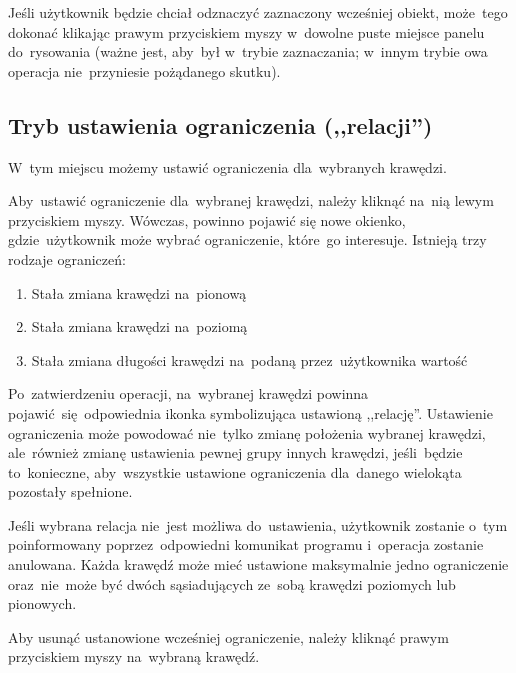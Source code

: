 \documentclass[11pt, a4paper]{article}
\begin{document}
 Jeśli użytkownik będzie chciał odznaczyć zaznaczony wcześniej obiekt, 
 może~tego dokonać klikając prawym przyciskiem myszy
 w~dowolne puste miejsce panelu do~rysowania (ważne jest, aby~był w~trybie zaznaczania; w~innym trybie owa operacja
 nie~przyniesie pożądanego skutku).
 
 \hypertarget{Relation}{\subsection{Tryb ustawienia ograniczenia (,,relacji'')}}
 W~tym miejscu możemy ustawić ograniczenia dla~wybranych krawędzi.
 
 Aby~ustawić ograniczenie dla~wybranej krawędzi, należy kliknąć na~nią lewym przyciskiem myszy.
 Wówczas, powinno pojawić się nowe okienko, gdzie~użytkownik może wybrać ograniczenie, które~go interesuje.
 Istnieją trzy rodzaje ograniczeń:
 \begin{enumerate}
  \item Stała zmiana krawędzi na~pionową
  \item Stała zmiana krawędzi na~poziomą
  \item Stała zmiana długości krawędzi na~podaną przez~użytkownika wartość
 \end{enumerate}
 Po~zatwierdzeniu operacji, na~wybranej krawędzi powinna pojawić~się odpowiednia ikonka symbolizująca ustawioną ,,relację''.
 Ustawienie ograniczenia może powodować nie~tylko zmianę położenia wybranej krawędzi, ale~również zmianę ustawienia
 pewnej grupy innych krawędzi, jeśli~będzie to~konieczne, aby~wszystkie ustawione ograniczenia dla~danego wielokąta
 pozostały spełnione.
 
 Jeśli wybrana relacja nie~jest możliwa do~ustawienia, użytkownik zostanie o~tym poinformowany poprzez~odpowiedni komunikat
 programu i~operacja zostanie anulowana.  Każda krawędź może mieć ustawione maksymalnie jedno ograniczenie oraz~nie~może być dwóch sąsiadujących ze~sobą krawędzi
 poziomych lub pionowych.
 
 Aby usunąć ustanowione wcześniej ograniczenie, należy kliknąć prawym przyciskiem myszy na~wybraną krawędź.
 
 
\end{document}
